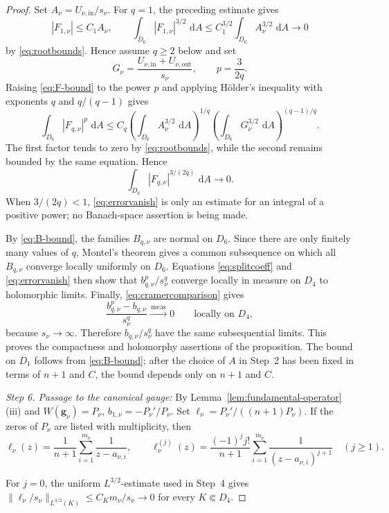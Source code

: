 \documentclass[12pt,letterpaper,reqno]{amsart}
\theoremstyle{definition}
\numberwithin{equation}{section}
\newcommand{\dA}{\,\mathrm dA}
\newcommand{\convmeas}{\xrightarrow{\,\mathrm{meas}\,}}
\newcommand{\gv}{\bm g}
\begin{document}
\begin{proof}
Set \(A_\nu=U_{\nu,\mathrm{in}}/s_\nu\). For \(q=1\), the preceding
estimate gives
\[
 |F_{1,\nu}|\le C_1A_\nu,
 \qquad
 \int_{D_6}|F_{1,\nu}|^{3/2}\,\dA
 \le C_1^{3/2}\int_{D_6}A_\nu^{3/2}\,\dA
 \longrightarrow0
\]
by \eqref{eq:rootbounds}. Hence assume \(q\ge2\) below and set
\[
G_\nu=\frac{U_{\nu,\mathrm{in}}+U_{\nu,\mathrm{out}}}{s_\nu},
\qquad p=\frac{3}{2q}.
\]
Raising \eqref{eq:F-bound} to the power \(p\) and applying H\"older's
inequality with exponents \(q\) and \(q/(q-1)\) gives
\[
 \int_{D_6}|F_{q,\nu}|^p\,\dA
 \leq
 C_q
 \left(
 \int_{D_6}A_\nu^{3/2}\,\dA
 \right)^{1/q}
 \left(
 \int_{D_6}G_\nu^{3/2}\,\dA
 \right)^{(q-1)/q}.
\]
The first factor tends to zero by \eqref{eq:rootbounds}, while the
second remains bounded by the same equation. Hence
\begin{equation}\label{eq:errorvanish}
 \int_{D_6}|F_{q,\nu}|^{3/(2q)}\,\dA
 \longrightarrow0.
\end{equation}
When \(3/(2q)<1\), \eqref{eq:errorvanish} is only an estimate for an
integral of a positive power; no Banach-space assertion is being made.

By \eqref{eq:B-bound}, the families \(B_{q,\nu}\) are normal on
\(D_6\). Since there are only finitely many values of \(q\), Montel's
theorem gives a common subsequence on which all \(B_{q,\nu}\)
converge locally uniformly on \(D_6\). Equations
\eqref{eq:splitcoeff} and \eqref{eq:errorvanish} then show that
\(b_{q,\nu}^p/s_\nu^q\) converge locally in measure on \(D_4\) to
holomorphic limits. Finally, \eqref{eq:cramercomparison} gives
\[
 \frac{b_{q,\nu}^p-b_{q,\nu}}{s_\nu^q}
 \convmeas0
 \qquad\text{locally on }D_4,
\]
because \(s_\nu\to\infty\). Therefore
\(b_{q,\nu}/s_\nu^q\) have the same subsequential limits. This proves
the compactness and holomorphy assertions of the proposition.
The bound on \(D_1\) follows from \eqref{eq:B-bound}; after the choice
of \(A\) in Step~2 has been fixed in terms of \({n+1}\) and \(C\), the
bound depends only on \({n+1}\) and \(C\).


\medskip\noindent
\emph{{Step 6. Passage to the canonical gauge:}}
By Lemma~\ref{lem:fundamental-operator}(iii) and
\(W(\gv_\nu)=P_\nu\),
\(b_{1,\nu}=-P_\nu'/P_\nu\).
Set
\(\ell_\nu=P_\nu'/((n+1)P_\nu)\).
If the zeros of \(P_\nu\) are listed with multiplicity, then
\[
 \ell_\nu(z)
 =
 \frac1{n+1}\sum_{i=1}^{m_\nu}\frac1{z-a_{\nu,i}},
 \qquad
 \ell_\nu^{(j)}(z)
 =
 \frac{(-1)^j j!}{{n+1}}
 \sum_{i=1}^{m_\nu}
 \frac1{(z-a_{\nu,i})^{j+1}}
 \quad(j\geq1).
\]

For \(j=0\), the uniform \(L^{3/2}\)-estimate used in Step~4 gives
\(\|\ell_\nu/s_\nu\|_{L^{3/2}(K)}
 \leq C_Km_\nu/s_\nu\to0\)
for every \(K\Subset D_4\).


\end{proof}
\end{document}
